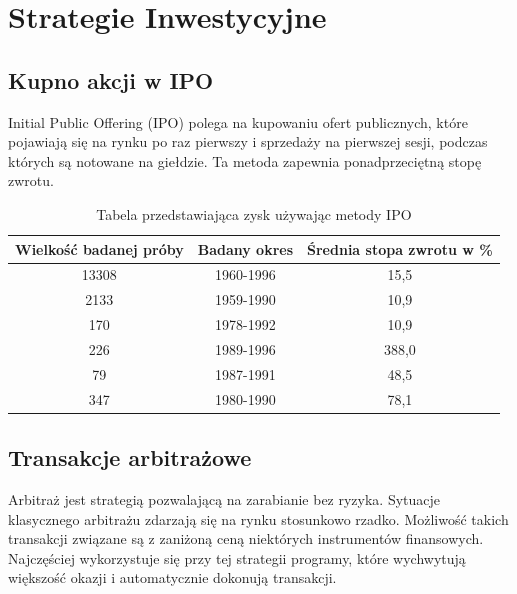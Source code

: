 \documentclass{report}
\begin{document}
\chapter{Strategie Inwestycyjne}
\section{Kupno akcji w IPO}
Initial Public Offering\cite{perz2008sztuka} (IPO) polega na kupowaniu ofert publicznych, które pojawiają się na rynku po raz pierwszy i sprzedaży na pierwszej sesji, podczas których są notowane na giełdzie. Ta metoda zapewnia ponadprzeciętną stopę zwrotu.
\newline
\begin{table}[h]
\begin{tabular}{|c|c|c|} \hline
Wielkość badanej próby & Badany okres & Średnia stopa zwrotu w \% \\
\hline
13308 & 1960-1996 & 15,5 \\
\hline
2133 & 1959-1990 & 10,9 \\
\hline
170 & 1978-1992 & 10,9 \\
\hline
226 & 1989-1996 & 388,0 \\
\hline
79 & 1987-1991 & 48,5 \\
\hline
347 & 1980-1990 & 78,1 \\
\hline
\end{tabular}
\caption{Tabela przedstawiająca zysk używając metody IPO}
\end{table}
\section{Transakcje arbitrażowe}
Arbitraż\cite{perz2008sztuka} jest strategią pozwalającą na zarabianie bez ryzyka. Sytuacje klasycznego arbitrażu zdarzają się na rynku stosunkowo rzadko. Możliwość takich transakcji związane są z zaniżoną ceną niektórych instrumentów finansowych. Najczęściej wykorzystuje się przy tej strategii programy, które wychwytują większość okazji i automatycznie dokonują transakcji.
\newpage
\listoffigures
\listoftables


\end{document}
